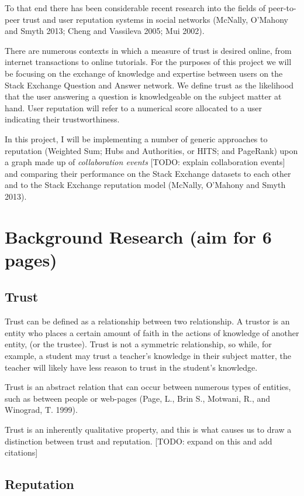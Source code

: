 \documentclass[]{final_report}
\begin{document}
To that end there has been considerable recent research into the fields of peer-to-peer trust and user reputation systems in social networks (McNally, O'Mahony and Smyth 2013; Cheng and Vassileva 2005; Mui 2002).

There are numerous contexts in which a measure of trust is desired online, from internet transactions to online tutorials. For the purposes of this project we will be focusing on the exchange of knowledge and expertise between users on the Stack Exchange Question and Answer network. We define trust as the likelihood that the user answering a question is knowledgeable on the subject matter at hand. User reputation will refer to a numerical score allocated to a user indicating their trustworthiness.

In this project, I will be implementing a number of generic approaches to reputation (Weighted Sum; Hubs and Authorities, or HITS; and PageRank) upon a graph made up of \textsl{collaboration events} [TODO: explain collaboration events] and comparing their performance on the Stack Exchange datasets to each other and to the Stack Exchange reputation model (McNally, O'Mahony and Smyth 2013).

\chapter{Background Research (aim for 6 pages)}

\section{Trust}

Trust can be defined as a relationship between two relationship. A trustor is an entity who places a certain amount of faith in the actions of knowledge of another entity, (or the trustee). Trust is not a symmetric relationship, so while, for example, a student may trust a teacher's knowledge in their subject matter, the teacher will likely have less reason to trust in the student's knowledge.

Trust is an abstract relation that can occur between numerous types of entities, such as between people or web-pages (Page, L., Brin S., Motwani, R., and Winograd, T. 1999).

Trust is an inherently qualitative property, and this is what causes us to draw a distinction between trust and reputation. [TODO: expand on this and add citations]

\section{Reputation}
\end{document}
